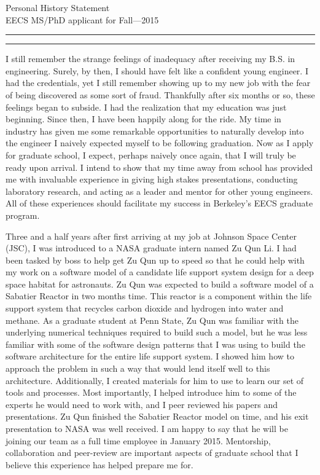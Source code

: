 \documentclass{article}
\newcommand{\soptitle}{Personal History Statement}
\begin{document}
\begin{center}\LARGE\soptitle\\
\large EECS MS/PhD applicant for Fall---2015
\end{center}

\hrule
\vspace{1pt}
\hrule height 1pt

\bigskip

I still remember the strange feelings of inadequacy after receiving my B.S. in engineering.
Surely, by then, I should have felt like a confident young engineer. I had the credentials,
yet I still remember showing up to my new job with the fear of being discovered as
some sort of fraud. Thankfully after six months or so, these feelings began to subside. I
had the realization that my education was just beginning. Since then, I have been happily
along for the ride. My time in industry has given me some remarkable opportunities to
naturally develop into the engineer I naively expected myself to be following graduation.
Now as I apply for graduate school, I expect, perhaps naively once again, that I 
will truly be ready upon arrival. I intend to show that my time away from school has
provided me with invaluable experience in giving high stakes presentations, conducting
laboratory research, and acting as a leader and mentor for other young engineers.
All of these experiences should facilitate my success in Berkeley's EECS graduate program.

Three and a half years after first arriving at my job at Johnson Space Center (JSC),
I was introduced to a NASA graduate intern named Zu Qun Li. I had been tasked by boss to help
get Zu Qun up to speed so that he could help with my work on a software model of a
candidate life support system design for a deep space habitat for astronauts.
Zu Qun was expected to build a software model of a Sabatier Reactor in two months time.
This reactor is a component within the life support system that recycles
carbon dioxide and hydrogen into water and methane. As a graduate student at Penn State, Zu Qun
was familiar with the underlying numerical techniques required to build such a model, but
he was less familiar with some of the software design patterns that I was using to build
the software architecture for the entire life support system. I showed him 
how to approach the problem in such a way that would lend itself well to this architecture.
Additionally, I created materials for him to use to learn our set of tools and processes. Most importantly,
I helped introduce him to some of the experts he would need to work with, and I peer reviewed
his papers and presentations. Zu Qun finished the Sabatier Reactor model on time, and
his exit presentation to NASA was well received. I am happy to say that he will be
joining our team as a full time employee in January 2015. Mentorship, collaboration and
peer-review are important aspects of graduate school that I believe this experience has
helped prepare me for.
\end{document}
